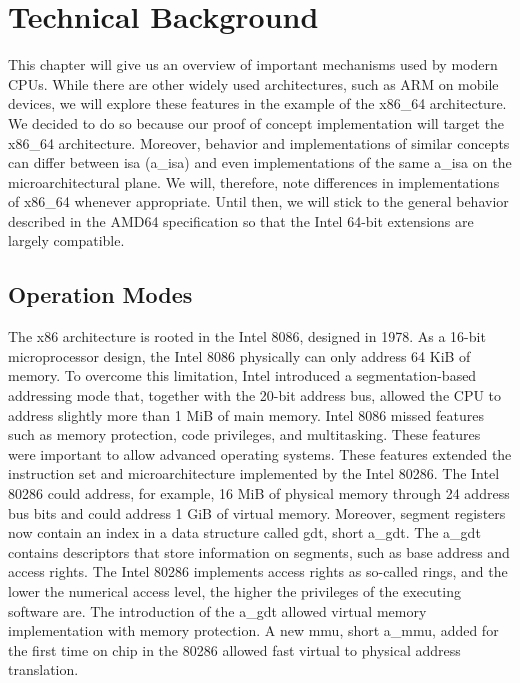 \section{Technical Background}
\label{sec:state:technical}
This chapter will give us an overview of important mechanisms used by modern
CPUs. While there are other widely used architectures, such as ARM on
mobile devices, we will explore these features in the example of the x86\_64
architecture. \\

We decided to do so because our proof of concept implementation will target
the x86\_64 architecture. Moreover, behavior and implementations of similar
concepts can differ between \gls{isa} (\acrshort{a_isa}) and even
implementations of the same \acrshort{a_isa} on the microarchitectural plane.
We will, therefore, note differences in implementations of x86\_64 whenever
appropriate. Until then, we will stick to the general behavior described in
the AMD64 specification so that the Intel 64-bit extensions are largely
compatible.

\subsection{Operation Modes}
\label{sec:state:technical:modes}
The x86 architecture is rooted in the Intel 8086, designed in 1978. As
a 16-bit microprocessor design, the Intel 8086 physically can only address 64
KiB of memory. To overcome this limitation, Intel introduced a
segmentation-based addressing mode that, together with the 20-bit address bus,
allowed the CPU to address slightly more than 1 MiB of main memory. Intel 8086
missed features such as memory protection, code privileges, and multitasking.
These features were important to allow advanced operating systems. These
features extended the instruction set and microarchitecture
implemented by the Intel 80286. The Intel 80286 could address, for example,
16 MiB of physical memory through 24 address bus bits and could address 1 GiB of
virtual memory. Moreover, segment registers now contain an index in a
data structure called \gls{gdt}, short \acrshort{a_gdt}.
The \acrshort{a_gdt} contains descriptors that store information on segments,
such as base address and access rights. The Intel 80286 implements access rights
as so-called rings, and the lower the numerical access level, the higher the
privileges of the executing software are. The introduction of the
\acrshort{a_gdt} allowed virtual memory implementation with memory protection.
A new \gls{mmu}, short \acrshort{a_mmu}, added for the first time on chip in
the 80286 allowed fast virtual to physical address translation. \\


